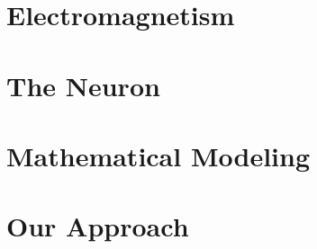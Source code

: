 \documentclass[../Orator.tex]{subfiles}
\begin{document}
\chapter{Electromagnetism}


\chapter{The Neuron}


\chapter{Mathematical Modeling}


\chapter{Our Approach}

\end{document}
